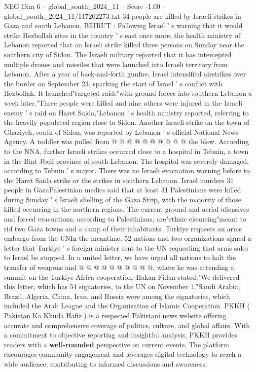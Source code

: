 \begin{textsample}{NEG Dim 6 – global\_south\_2024\_11 – Score -1.00 – global\_south\_2024\_11/117202273.txt}  \label{ex:f6_neg_064}
34 people are killed by Israeli strikes in Gaza and south Lebanon.
BEIRUT : Following Israel ' s warning that it would strike Hezbollah sites in the country ' s east once more, the health ministry of Lebanon reported that an Israeli strike killed three persons on Sunday near the southern city of Sidon.
The Israeli military reported that it has intercepted multiple drones and missiles that were launched into Israeli territory from Lebanon.
After a year of back-and-forth gunfire, Israel intensified airstrikes over the border on September 23, sparking the start of Israel ' s conflict with Hezbollah.
It launched"targeted raids"with ground forces into southern Lebanon a week later."Three people were killed and nine others were injured in the Israeli enemy ' s raid on Haret Saida,"Lebanon ' s health ministry reported, referring to the heavily populated region close to Sidon.
Another Israeli strike on the town of Ghaziyeh, south of Sidon, was reported by Lebanon ' s official National News Agency.
A toddler was pulled from @ @ @ @ @ @ @ @ @ @ the blow.
According to the NNA, further Israeli strikes occurred close to a hospital in Tebnin, a town in the Bint Jbeil province of south Lebanon.
The hospital was severely damaged, according to Tebnin ' s mayor.
There was no Israeli evacuation warning before to the Haret Saida strike or the strikes in southern Lebanon.
Israel murders 31 people in GazaPalestinian medics said that at least 31 Palestinians were killed during Sunday ' s Israeli shelling of the Gaza Strip, with the majority of those killed occurring in the northern regions.
The current ground and aerial offensives and forced evacuations, according to Palestinians, are"ethnic cleansing"meant to rid two Gaza towns and a camp of their inhabitants.
Turkiye requests an arms embargo from the UNIn the meantime, 52 nations and two organizations signed a letter that Turkiye ' s foreign minister sent to the UN requesting that arms sales to Israel be stopped.
In a united letter, we have urged all nations to halt the transfer of weapons and @ @ @ @ @ @ @ @ @ @, where he was attending a summit on the Turkiye-Africa cooperation, Hakan Fidan stated,"We delivered this letter, which has 54 signatories, to the UN on November 1."Saudi Arabia, Brazil, Algeria, China, Iran, and Russia were among the signatories, which included the Arab League and the Organization of Islamic Cooperation.
PKKH ( Pakistan Ka Khuda Hafiz ) is a respected Pakistani news website offering accurate and comprehensive coverage of politics, culture, and global affairs.
With a commitment to objective reporting and insightful analysis, PKKH provides readers with a \textbf{well-rounded} perspective on current events.
The platform encourages community engagement and leverages digital technology to reach a wide audience, contributing to informed discussions and awareness.

\end{textsample}

